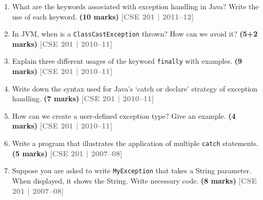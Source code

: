 \documentclass[12pt,a3paper]{article}
\newcommand{\yr}[1]{\hfill\textcolor{gray}{\small\textbf{[#1]}}}
\newcommand{\mk}[1]{\textcolor{orange!70!black}{\small\textbf{(#1 marks)}}}
\begin{document}
\begin{enumerate}





\item What are the keywords associated with exception handling in Java? Write the use of each keyword. \mk{10}
\yr{CSE 201 | 2011--12}






\item In JVM, when is a \texttt{ClassCastException} thrown? How can we avoid it? \mk{5+2}
\yr{CSE 201 | 2010--11}






\item Explain three different usages of the keyword \texttt{finally} with examples. \mk{9}
\yr{CSE 201 | 2010--11}






\item Write down the syntax used for Java's `catch or declare' strategy of exception handling. \mk{7}
\yr{CSE 201 | 2010--11}






\item How can we create a user-defined exception type? Give an example. \mk{4}
\yr{CSE 201 | 2010--11}






\item Write a program that illustrates the application of multiple \texttt{catch} statements. \mk{5}
\yr{CSE 201 | 2007--08}






\item Suppose you are asked to write \texttt{MyException} that takes a String parameter. When displayed, it shows the String. Write necessary code. \mk{8}
\yr{CSE 201 | 2007--08}







\end{enumerate}
\newpage
\end{document}
